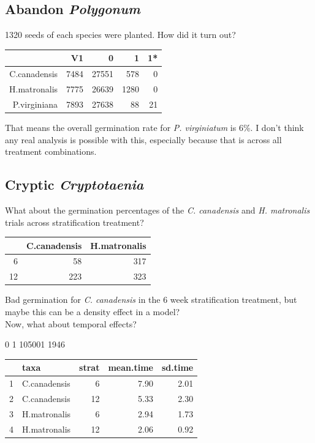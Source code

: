 \documentclass{article}\usepackage[]{graphicx}\usepackage[]{color}
\begin{document}
\subsection{Abandon \textit{Polygonum}}
1320 seeds of each species were planted. How did it turn out?\\
\begin{table}[ht]
\centering
\begin{tabular}{rrrrr}
  \hline
 & V1 & 0 & 1 & 1* \\ 
  \hline
C.canadensis & 7484 & 27551 & 578 &   0 \\ 
  H.matronalis & 7775 & 26639 & 1280 &   0 \\ 
  P.virginiana & 7893 & 27638 &  88 &  21 \\ 
   \hline
\end{tabular}
\end{table}


 That means the overall germination rate for \textit{P. virginiatum} is 6\%. I don't think any real analysis is possible with this, especially because that is across all treatment combinations.\\
\subsection{Cryptic \textit{Cryptotaenia}}
What about the germination percentages of the \textit{C. canadensis} and \textit{H. matronalis} trials across stratification treatment?
\begin{table}[ht]
\centering
\begin{tabular}{rrr}
  \hline
 & C.canadensis & H.matronalis \\ 
  \hline
6 &  58 & 317 \\ 
  12 & 223 & 323 \\ 
   \hline
\end{tabular}
\end{table}

Bad germination for \textit{C. canadensis} in the 6 week stratification treatment, but maybe this can be a density effect in a model?\\

Now, what about temporal effects?

     0      1 
105001   1946 
\begin{table}[ht]
\centering
\begin{tabular}{rlrrr}
  \hline
 & taxa & strat & mean.time & sd.time \\ 
  \hline
1 & C.canadensis &   6 & 7.90 & 2.01 \\ 
  2 & C.canadensis &  12 & 5.33 & 2.30 \\ 
  3 & H.matronalis &   6 & 2.94 & 1.73 \\ 
  4 & H.matronalis &  12 & 2.06 & 0.92 \\ 
   \hline
\end{tabular}
\end{table}
\end{document}

